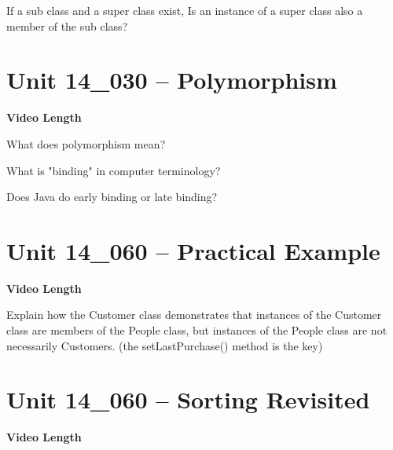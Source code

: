\documentclass[letterpaper,12pt]{exam}
\newcommand{\unit}{Unit 14}
\begin{document}
\begin{questions}
\begin{samepage}
    \question If a sub class and a super class exist, Is an instance of a super class also a member of the sub class?
    \vspace{5mm}
\end{samepage}


\section*{\unit\_030 -- Polymorphism} 
\par{\selectfont\textbf{Video Length }}

\begin{samepage}
    \question What does polymorphism mean?
    \vspace{5mm}
\end{samepage}

\begin{samepage}
    \question What is "binding" in computer terminology?
    \vspace{5mm}
\end{samepage}

\begin{samepage}
    \question Does Java do early binding or late binding?
    \vspace{5mm}
\end{samepage}


\section*{\unit\_060 -- Practical Example} 
\par{\selectfont\textbf{Video Length }}

\begin{samepage}
    \question Explain how the Customer class demonstrates that instances of the Customer class are members of the People class, but instances of the People class are not necessarily Customers.  (the setLastPurchase() method is the key)
    \vspace{25mm}
\end{samepage}


\section*{\unit\_060 -- Sorting Revisited} 
\par{\selectfont\textbf{Video Length }}


\end{questions}
\end{document}
